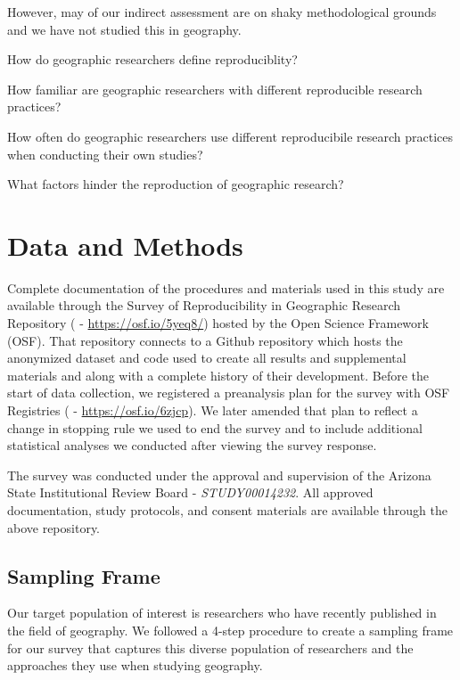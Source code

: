 \documentclass[]{interact}
\theoremstyle{plain}%
\theoremstyle{definition}
\theoremstyle{remark}
\begin{document}
However, may of our indirect assessment are on shaky methodological grounds and we have not studied this in geography. 

\begin{description}
\setlength{\itemindent}{0ex}
    \item[\textbf{(Q1)}] How do geographic researchers define reproduciblity?
    \item[\textbf{(Q2)}] How familiar are geographic researchers with different reproducible research practices?
    \item[\textbf{(Q3)}] How often do geographic researchers use different reproducibile research practices when conducting their own studies? 
    \item[\textbf{(Q4)}] What factors hinder the reproduction of geographic research?
\end{description}


\section*{Data and Methods}
Complete documentation of the procedures and materials used in this study are available through the Survey of Reproducibility in Geographic Research Repository (\citet{Kedron_Holler_Bardin_Hilgendorf_2022} - \url{https://osf.io/5yeq8/}) hosted by the Open Science Framework (OSF).
That repository connects to a Github repository which hosts the anonymized dataset and code used to create all results and supplemental materials and along with a complete history of their development. 
Before the start of data collection, we registered a preanalysis plan for the survey with OSF Registries (\citet{Kedron_Survey_PAP} - \url{https://osf.io/6zjcp}). 
We later amended that plan to reflect a change in stopping rule we used to end the survey and to include additional statistical analyses we conducted after viewing the survey response. 

The survey was conducted under the approval and supervision of the Arizona State Institutional Review Board - \textit{STUDY00014232}.
All approved documentation, study protocols, and consent materials are available through the above repository.

\subsection*{Sampling Frame}
Our target population of interest is researchers who have recently published in the field of geography. 
We followed a 4-step procedure to create a sampling frame for our survey that captures this diverse population of researchers and the approaches they use when studying geography. 
\end{document}

